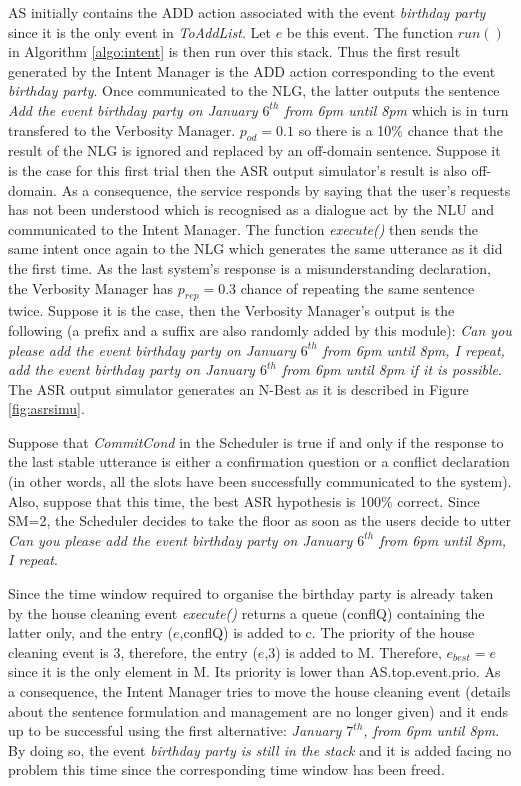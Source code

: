 				AS initially contains the ADD action associated with the event \textit{birthday party} since it is the only event in \textit{ToAddList}. Let $e$ be this event. The function $run()$ in Algorithm \ref{algo:intent} is then run over this stack. Thus the first result generated by the Intent Manager is the ADD action corresponding to the event \textit{birthday party}. Once communicated to the NLG, the latter outputs the sentence \textit{Add the event birthday party on January $6^{th}$ from 6pm until 8pm} which is in turn transfered to the Verbosity Manager. $p_{od}=0.1$ so there is a 10\% chance that the result of the NLG is ignored and replaced by an off-domain sentence. Suppose it is the case for this first trial then the ASR output simulator's result is also off-domain. As a consequence, the service responds by saying that the user's requests has not been understood which is recognised as a dialogue act by the NLU and communicated to the Intent Manager. The function \textit{execute()} then sends the same intent once again to the NLG which generates the same utterance as it did the first time. As the last system's response is a misunderstanding declaration, the Verbosity Manager has $p_{rep}=0.3$ chance of repeating the same sentence twice. Suppose it is the case, then the Verbosity Manager's output is the following (a prefix and a suffix are also randomly added by this module): \textit{Can you please add the event birthday party on January $6^{th}$ from 6pm until 8pm, I repeat, add the event birthday party on January $6^{th}$ from 6pm until 8pm if it is possible}. The ASR output simulator generates an N-Best as it is described in Figure \ref{fig:asrsimu}.
				
				Suppose that \textit{CommitCond} in the Scheduler is true if and only if the response to the last stable utterance is either a confirmation question or a conflict declaration (in other words, all the slots have been successfully communicated to the system). Also, suppose that this time, the best ASR hypothesis is 100\% correct. Since SM=2, the Scheduler decides to take the floor as soon as the users decide to utter \textit{Can you please add the event birthday party on January $6^{th}$ from 6pm until 8pm, I repeat}.
				
				Since the time window required to organise the birthday party is already taken by the house cleaning event \textit{execute()} returns a queue (conflQ) containing the latter only, and the entry ($e$,conflQ) is added to c. The priority of the house cleaning event is 3, therefore, the entry ($e$,3) is added to M. Therefore, $e_{best} = e$ since it is the only element in M. Its priority is lower than AS.top.event.prio. As a consequence, the Intent Manager tries to move the house cleaning event (details about the sentence formulation and management are no longer given) and it ends up to be successful using the first alternative: \textit{January $7^{th}$, from 6pm until 8pm}. By doing so, the event \textit{birthday party is still in the stack} and it is added facing no problem this time since the corresponding time window has been freed.
